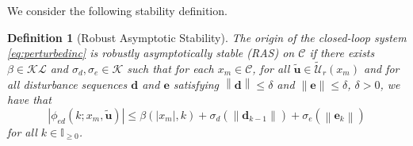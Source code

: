 \documentclass{article}
\newtheorem{definition}{Definition}
\newcommand{\abs}[1]{\left\lvert #1 \right\rvert}
\newcommand{\norm}[1]{\left\lVert #1 \right\rVert}
\begin{document}
We consider the following stability definition.
\begin{definition}[Robust Asymptotic Stability]
\label{def:ras}
The origin of the closed-loop system \eqref{eq:perturbedinc} is robustly asymptotically stable
(RAS) on $\mathcal{C}$
if there exists $\beta \in \mathcal{KL}$ and $\sigma_d,\sigma_e \in \mathcal{K}$ such that
for each $x_m \in \mathcal{C}$, for all $\tilde{\mathbf{u}} \in \tilde{\mathcal{U}}_r(x_m)$ and for all disturbance sequences $\mathbf{d}$ and $\mathbf{e}$
satisfying $\norm{\mathbf{d}} \leq \delta$ and $\norm{\mathbf{e}} \leq \delta$, $\delta > 0$, we have that
\begin{equation}
\label{eq:ras}
\abs{\phi_{ed}(k;x_m,\tilde{\mathbf{u}})} \leq \beta(\abs{x_m},k) + \sigma_d(\norm{
\mathbf{d}_{k-1}})+ \sigma_e(\norm{\mathbf{e}_k})
\end{equation}
for all $k \in \mathbb{I}_{\geq 0}$.
\end{definition}
\end{document}
